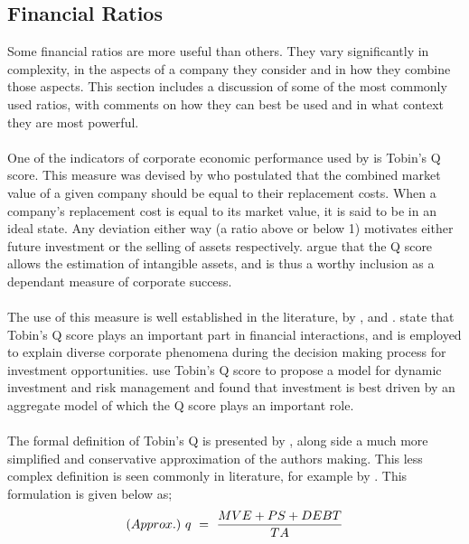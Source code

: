 \subsection{Financial Ratios}\label{FinancialRatios}
{Some financial ratios are more useful than others. They vary significantly in complexity, in the aspects of a company they consider and in how they combine those aspects. This section includes a discussion of some of the most commonly used ratios, with comments on how they can best be used and in what context they are most powerful. \\\\
One of the indicators of corporate economic performance used by \cite{moldovan2015learning} is Tobin's Q score. This measure was devised by \cite{tobin1969general} who postulated that the combined market value of a given company should be equal to their replacement costs. When a company's replacement cost is equal to its market value, it is said to be in an ideal state. Any deviation either way (a ratio above or below 1) motivates either future investment or the selling of assets respectively. \cite{moldovan2015learning} argue that the Q score allows the estimation of intangible assets, and is thus a worthy inclusion as a dependant measure of corporate success. \\\\
The use of this measure is well established in the literature, by \cite{chung1994simple}, 
\cite{bhagat2008corporate} and \cite{bolton2011unified}. \cite{chung1994simple} state that Tobin's Q score plays an important part in financial interactions, and is employed to explain diverse corporate phenomena during the  decision making process for investment opportunities. \cite{bolton2011unified} use Tobin's Q score to propose a model for dynamic investment and risk management and found that investment is best driven by an aggregate model of which the Q score plays an important role. \\\\
The formal definition of Tobin's Q is presented by \cite{chung1994simple}, along side a much more simplified and conservative approximation of the authors making. This less complex definition is seen commonly in literature, for example by \cite{wahba2008does}. This formulation is given below as; \\
\begin {equation}\label{TobinQ}
(Approx.) \ q  \ = \ \small {\frac{MVE + PS + DEBT}{TA}}
\end{equation}\\
}
